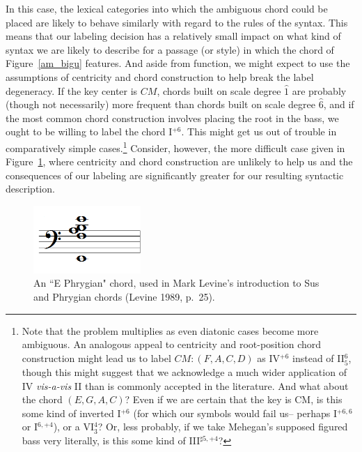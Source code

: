 In this case, the lexical categories into which the ambiguous chord could be placed are likely to behave similarly with regard to the rules of the syntax.  This means that our labeling decision has a relatively small impact on what kind of syntax we are likely to describe for a passage (or style) in which the chord of Figure~\ref{am_bigu} features.  And aside from function, we might expect to use the assumptions of centricity and chord construction to help break the label degeneracy.  If the key center is $CM$, chords built on scale degree $\hat{1}$ are probably (though not necessarily) more frequent than chords built on scale degree $\hat{6}$, and if the most common chord construction involves placing the root in the bass, we ought to be willing to label the chord I$^{+6}$.  This might get us out of trouble in comparatively simple cases.\footnote{Note that the problem multiplies as even diatonic cases become more ambiguous.  An analogous appeal to centricity and root-position chord construction might lead us to label $CM: (F,A,C,D)$ as IV$^{+6}$ instead of II$^{6}_5$, though this might suggest that we acknowledge a much wider application of IV \emph{vis-a-vis} II than is commonly accepted in the literature. And what about the chord $(E,G,A,C)$?  Even if we are certain that the key is CM, is this some kind of inverted I$^{+6}$ (for which our symbols would fail us-- perhaps I$^{+6,6}$ or I$^{6,+4}$), or a VI$^{4}_3$?  Or, less probably, if we take Mehegan's supposed figured bass very literally, is this some kind of III$^{\sharp 5, +4}$?}  Consider, however, the more difficult case given in Figure~\ref{phry}, where centricity and chord construction are unlikely to help us and the consequences of our labeling are significantly greater for our resulting syntactic description.
\begin{figure}
	\centering
	\caption{An ``E Phrygian" chord, used in Mark Levine's introduction to Sus and Phrygian chords (Levine 1989, p.\ 25).}
	\label{phry}
	\includegraphics[width=1.6in]{diss_prospectus_ephryg.png}
\end{figure}

